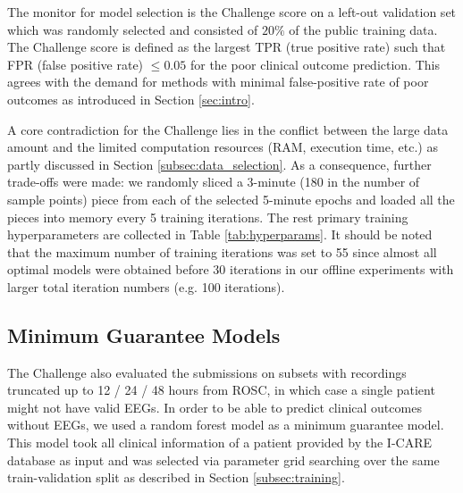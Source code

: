 

The monitor for model selection is the Challenge score on a left-out validation set which was randomly selected and consisted of $20\%$ of the public training data. The Challenge score is defined as the largest TPR (true positive rate) such that FPR (false positive rate) $\le 0.05$ for the poor clinical outcome prediction. This agrees with the demand for methods with minimal false-positive rate of poor outcomes as introduced in Section \ref{sec:intro}.

A core contradiction for the Challenge lies in the conflict between the large data amount and the limited computation resources (RAM, execution time, etc.) as partly discussed in Section \ref{subsec:data_selection}. As a consequence, further trade-offs were made: we randomly sliced a 3-minute (180 in the number of sample points) piece from each of the selected 5-minute epochs and loaded all the pieces into memory every 5 training iterations. The rest primary training hyperparameters are collected in Table \ref{tab:hyperparams}. It should be noted that the maximum number of training iterations was set to 55 since almost all optimal models were obtained before 30 iterations in our offline experiments with larger total iteration numbers (e.g. 100 iterations).




\subsection{Minimum Guarantee Models}
\label{subsec:min_grt_models}

The Challenge also evaluated the submissions on subsets with recordings truncated up to 12 / 24 / 48 hours from ROSC, in which case a single patient might not have valid EEGs. In order to be able to predict clinical outcomes without EEGs, we used a random forest model as a minimum guarantee model. This model took all clinical information of a patient provided by the I-CARE database as input and was selected via parameter grid searching over the same train-validation split as described in Section \ref{subsec:training}.
